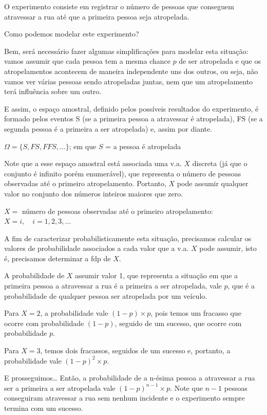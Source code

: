 \documentclass[
]{book}
\theoremstyle{definition}
\theoremstyle{definition}
\theoremstyle{definition}
\theoremstyle{remark}
\begin{document}
O experimento consiste em registrar o número de pessoas que conseguem atravessar a rua até que a primeira pessoa seja atropelada.

Como podemos modelar este experimento?

Bem, será necessário fazer algumas simplificações para modelar esta situação: vamos assumir que cada pessoa tem a mesma chance \(p\) de ser atropelada e que os atropelamentos acontecem de maneira independente uns dos outros, ou seja, não vamos ver várias pessoas sendo atropeladas juntas, nem que um atropelamento terá influência sobre um outro.

E assim, o espaço amostral, definido pelos possíveis resultados do experimento, é formado pelos eventos S (se a primeira pessoa a atravessar é atropelada), FS (se a segunda pessoa é a primeira a ser atropelada) e, assim por diante.

\(\Omega = \{ S, FS, FFS, \ldots\}\); em que \(S\) = a pessoa é atropelada

Note que a esse espaço amostral está associada uma v.a. \(X\) discreta (já que o conjunto é infinito porém enumerável), que representa o número de pessoas observadas até o primeiro atropelamento. Portanto, \(X\) pode assumir qualquer valor no conjunto dos números inteiros maiores que zero.

\(X =\) número de pessoas observadas até o primeiro atropelamento:\\
\(X = i, \quad i = 1, 2, 3, \ldots\)

A fim de caracterizar probabilisticamente esta situação, precisamos calcular os valores de probabilidade associados a cada valor que a v.a. \(X\) pode assumir, isto é, precisamos determinar a fdp de \(X\).

A probabilidade de \(X\) assumir valor 1, que representa a situação em que a primeira pessoa a atravessar a rua é a primeira a ser atropelada, vale \(p\), que é a probabilidade de qualquer pessoa ser atropelada por um veículo.

Para \(X =2\), a probabilidade vale \((1-p) \times p\), pois temos um fracasso que ocorre com probabilidade \((1-p)\), seguido de um sucesso, que ocorre com probabilidade \(p\).

Para \(X = 3\), temos dois fracassos, seguidos de um sucesso e, portanto, a probabilidade vale \((1-p)^2 \times p\).

E prosseguimos\ldots{} Então, a probabilidade de a n-ésima pessoa a atravessar a rua ser a primeira a ser atropelada vale \((1-p)^{n-1} \times p\). Note que \(n-1\) pessoas conseguiram atravessar a rua sem nenhum incidente e o experimento sempre termina com um sucesso.
\end{document}
